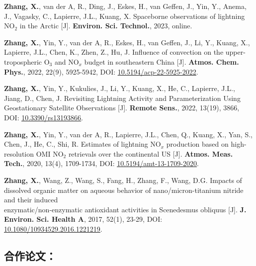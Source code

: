 \begin{enumerate}[label={[\arabic*]}, leftmargin=20pt, widest=0, itemindent=*, topsep=0pt, partopsep=0pt, parsep=0pt]

\item \textbf{Zhang, X.}, van der A, R., Ding, J., Eskes, H., van Geffen, J., Yin, Y., Anema, J.,
Vagasky, C., Lapierre, J.L., Kuang, X. Spaceborne observations of lightning
NO$_2$ in the Arctic [J]. \textbf{Environ. Sci. Technol.}, 2023, online. %

\item \textbf{Zhang, X.}, Yin, Y., van der A, R., Eskes, H., van Geffen, J., Li, Y., Kuang, X., Lapierre,
J.L., Chen, K., Zhen, Z., Hu, J. Influence of convection on the
upper-tropospheric O$_3$ and NO$_x$ budget in southeastern China [J].
\textbf{Atmos. Chem. Phys.}, 2022, 22(9), 5925-5942,
DOI: \underline{\href{https://doi.org/10.5194/acp-22-5925-2022}{10.5194/acp-22-5925-2022}}.

\item \textbf{Zhang, X.}, Yin, Y., Kukulies, J., Li, Y., Kuang, X., He, C., Lapierre, J.L., Jiang, D., Chen,
J. Revisiting Lightning Activity and Parameterization Using Geostationary
Satellite Observations [J].
\textbf{Remote Sens.}, 2022, 13(19), 3866,
DOI: \underline{\href{https://doi.org/10.3390/rs13193866}{10.3390/rs13193866}}.

\item \textbf{Zhang, X.}, Yin, Y., van der A, R., Lapierre, J.L., Chen, Q., Kuang, X., Yan, S., Chen, J.,
He, C., Shi, R. Estimates of lightning NO$_x$ production based on high-resolution
OMI NO$_2$ retrievals over the continental US [J].
\textbf{Atmos. Meas. Tech.}, 2020, 13(4), 1709-1734,
DOI: \underline{\href{https://doi.org/10.5194/amt-13-1709-2020}{10.5194/amt-13-1709-2020}}.

\item \textbf{Zhang, X.}, Wang, Z., Wang, S., Fang, H., Zhang, F., Wang, D.G.
Impacts of dissolved organic matter on aqueous behavior of nano/micron-titanium nitride and their induced \\
enzymatic/non-enzymatic antioxidant activities in Scenedesmus obliquus [J].
\textbf{J. Environ. Sci. Health A}, 2017, 52(1), 23-29,
DOI: \underline{\href{https://doi.org/10.1080/10934529.2016.1221219}{10.1080/10934529.2016.1221219}}.

\end{enumerate}

\subsection*{合作论文：}

